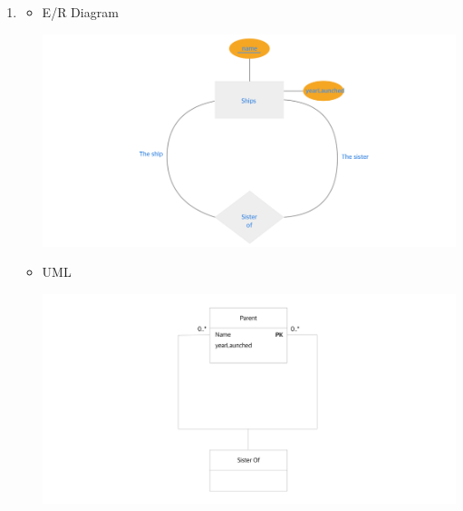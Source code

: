 \documentclass[12pt]{article}
\begin{document}
\begin{enumerate}[1.]
\begin{itemize}
    \end{itemize}

    \item

    \begin{itemize}
        \item E/R Diagram

        \begin{center}
        \includegraphics[width=\linewidth]{images/worksheet_15_solution_21.png}
        \end{center}

        \item UML

        \begin{center}
        \includegraphics[width=\linewidth]{images/worksheet_15_solution_22.png}
        \end{center}

    \end{itemize}


\end{enumerate}
\end{document}
